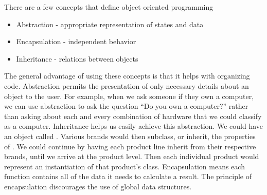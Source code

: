 There are a few concepts that define object oriented programming
\begin{itemize}
\item Abstraction - appropriate representation of states and data
\item Encapsulation - independent behavior
\item Inheritance - relations between objects
\end{itemize}
The general advantage of using these concepts is that it helps with organizing code.  Abstraction permits the presentation of only necessary details about an object to the user.  For example, when we ask someone if they own a computer, we can use abstraction to ask the question ``Do you own a computer?'' rather than asking about each and every combination of hardware that we could classify as a computer.  Inheritance helps us easily achieve this abstraction.  We could have an object called .  Various brands would then subclass, or inherit, the properties of .  We could continue by having each product line inherit from their respective brands, until we arrive at the product level.  Then each individual product would represent an instantiation of that product's class.
Encapsulation means each function contains all of the data it needs to calculate a result.  The principle of encapsulation discourages the use of global data structures.

